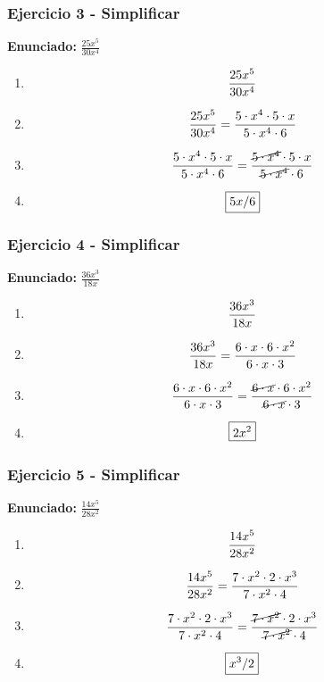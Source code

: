\documentclass[11pt,a4paper]{article}
\newcommand{\fitmath}[1]{%
\[
\setbox0=\hbox{$\displaystyle #1$}%
\ifdim\wd0>\linewidth
\resizebox{\linewidth}{!}{$\displaystyle #1$}%
\else
#1%
\fi
\]
}
\begin{document}
\vspace{0.12cm}
\subsubsection*{Ejercicio 3 - Simplificar}
\textbf{Enunciado:} $ \frac{25 x^{5}}{30 x^{4}} $\par
\begin{enumerate}[leftmargin=2em]
\item \fitmath{\frac{25 x^{5}}{30 x^{4}}}
\item \fitmath{\frac{25 x^{5}}{30 x^{4}}=\frac{5\cdot x^{4}\cdot 5\cdot x}{5\cdot x^{4}\cdot 6}}
\item \fitmath{\frac{5\cdot x^{4}\cdot 5\cdot x}{5\cdot x^{4}\cdot 6}=\frac{\cancel{5\cdot x^{4}}\cdot 5\cdot x}{\cancel{5\cdot x^{4}}\cdot 6}}
\item \fitmath{\boxed{5 x / 6}}
\end{enumerate}

\vspace{0.12cm}
\subsubsection*{Ejercicio 4 - Simplificar}
\textbf{Enunciado:} $ \frac{36 x^{3}}{18 x} $\par
\begin{enumerate}[leftmargin=2em]
\item \fitmath{\frac{36 x^{3}}{18 x}}
\item \fitmath{\frac{36 x^{3}}{18 x}=\frac{6\cdot x\cdot 6\cdot x^{2}}{6\cdot x\cdot 3}}
\item \fitmath{\frac{6\cdot x\cdot 6\cdot x^{2}}{6\cdot x\cdot 3}=\frac{\cancel{6\cdot x}\cdot 6\cdot x^{2}}{\cancel{6\cdot x}\cdot 3}}
\item \fitmath{\boxed{2 x^{2}}}
\end{enumerate}

\vspace{0.12cm}
\subsubsection*{Ejercicio 5 - Simplificar}
\textbf{Enunciado:} $ \frac{14 x^{5}}{28 x^{2}} $\par
\begin{enumerate}[leftmargin=2em]
\item \fitmath{\frac{14 x^{5}}{28 x^{2}}}
\item \fitmath{\frac{14 x^{5}}{28 x^{2}}=\frac{7\cdot x^{2}\cdot 2\cdot x^{3}}{7\cdot x^{2}\cdot 4}}
\item \fitmath{\frac{7\cdot x^{2}\cdot 2\cdot x^{3}}{7\cdot x^{2}\cdot 4}=\frac{\cancel{7\cdot x^{2}}\cdot 2\cdot x^{3}}{\cancel{7\cdot x^{2}}\cdot 4}}
\item \fitmath{\boxed{x^{3} / 2}}
\end{enumerate}
\end{document}
